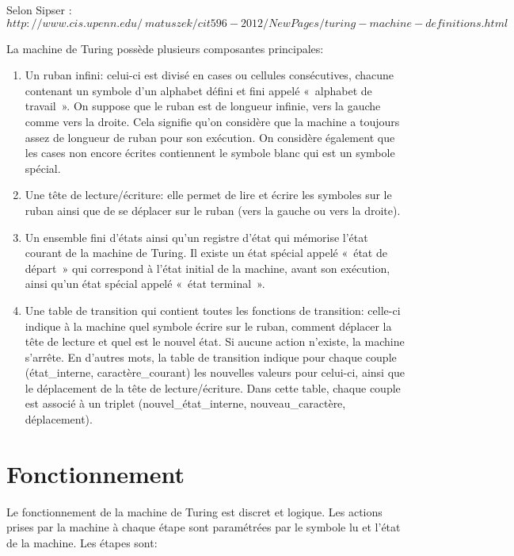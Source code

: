 \documentclass[a4paper, 10pt, titlepage]{report}
\begin{document}
Selon Sipser : $http://www.cis.upenn.edu/~matuszek/cit596-2012/NewPages/turing-machine-definitions.html$

La machine de Turing possède plusieurs composantes principales:
\begin{enumerate}
	\item Un ruban infini: celui-ci est divisé en cases ou cellules consécutives, chacune contenant un symbole d’un alphabet défini et fini appelé « alphabet de travail ». On suppose que le ruban est de longueur infinie, vers la gauche comme vers la droite. Cela signifie qu’on considère que la machine a toujours assez de longueur de ruban pour son exécution. On considère également que les cases non encore écrites contiennent le symbole blanc qui est un symbole spécial.
	\item Une tête de lecture/écriture: elle permet de lire et écrire les symboles sur le ruban ainsi que de se déplacer sur le ruban (vers la gauche ou vers la droite).
	\item Un ensemble fini d’états ainsi qu’un registre d’état qui mémorise l’état courant de la machine de Turing. Il existe un état spécial appelé « état de départ » qui correspond à l’état initial de la machine, avant son exécution, ainsi qu’un état spécial appelé « état terminal ».
	\item Une table de transition qui contient toutes les fonctions de transition: celle-ci indique à la machine quel symbole écrire sur le ruban, comment déplacer la tête de lecture et quel est le nouvel état. Si aucune action n’existe, la machine s’arrête. En d’autres mots, la table de transition indique pour chaque couple (état\_interne, caractère\_courant) les nouvelles valeurs pour celui-ci, ainsi que le déplacement de la tête de lecture/écriture. Dans cette table, chaque couple est associé à un triplet (nouvel\_état\_interne, nouveau\_caractère, déplacement).
\end{enumerate}

\section{Fonctionnement}

Le fonctionnement de la machine de Turing est discret et logique. Les actions prises par la machine à chaque étape sont paramétrées par le symbole lu et l’état de la machine. Les étapes sont:
\end{document}
